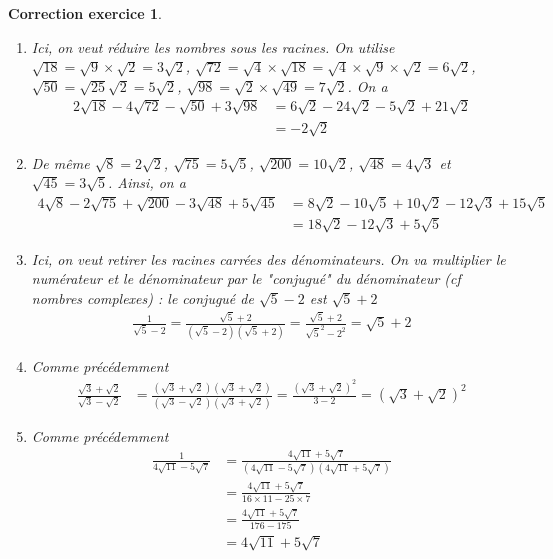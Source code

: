 \documentclass[12pt]{article}
\newtheorem{correction}{\bf Correction exercice}
\newenvironment{cor}{
\begin{correction}\smallskip\normalfont}{\end{correction}
}
\newif\ifcorrige\corrigetrue
\begin{document}
\ifcorrige
\color{magenta}
\begin{cor}
  $\qquad$
\begin{enumerate}
\item Ici, on veut r\'eduire les nombres sous les racines.
  On utilise $\sqrt{18} = \sqrt{9} \times \sqrt{2} = 3\sqrt{2}$,
  $\sqrt{72} = \sqrt{4} \times \sqrt{18} = \sqrt{4} \times \sqrt{9} \times \sqrt{2} = 6\sqrt{2}$,
  $\sqrt{50} = \sqrt{25} \sqrt{2} = 5 \sqrt{2}$,
  $\sqrt{98} = \sqrt{2} \times \sqrt{49} = 7 \sqrt{2}$.
  On a
  \begin{align*}
    2 \sqrt{18} - 4 \sqrt{72} - \sqrt{50} + 3\sqrt{98}
    &= 6 \sqrt{2} - 24 \sqrt{2} - 5 \sqrt{2} +  21\sqrt{2}
    \\
    &= -2 \sqrt{2}
  \end{align*}
\item De m\^eme
  $\sqrt{8} = 2 \sqrt{2}$, $\sqrt{75} = 5 \sqrt{5}$, $\sqrt{200} = 10 \sqrt{2}$,
  $\sqrt{48} = 4 \sqrt{3}$ et $\sqrt{45} = 3 \sqrt{5}$.
  Ainsi, on a
  \begin{align*}
    4\sqrt{8} -2\sqrt{75} + \sqrt{200}-3\sqrt{48}+5\sqrt{45}
    &= 8 \sqrt{2} - 10 \sqrt{5} + 10 \sqrt{2} - 12 \sqrt{3} +15 \sqrt{5}
    \\
    &= 18 \sqrt{2} - 12 \sqrt{3} + 5 \sqrt{5}
  \end{align*}
\item Ici, on veut retirer les racines carr\'ees des d\'enominateurs.
  On va multiplier le num\'erateur et le d\'enominateur par le "conjugu\'e" du d\'enominateur
  (cf nombres complexes) : le conjugu\'e de $\sqrt{5}-2$ est $\sqrt{5}+2$
  \begin{align*}
    \frac1{\sqrt{5}-2}
    = \frac{\sqrt{5}+2}{(\sqrt{5}-2)(\sqrt{5}+2)}= \frac{\sqrt{5}+2}{\sqrt{5}^2-2^2}
    = \sqrt{5}+2
  \end{align*}
\item Comme pr\'ec\'edemment
  \begin{align*}
    \frac{\sqrt{3}+\sqrt{2}}{\sqrt{3}-\sqrt{2}}
    &= \frac{(\sqrt{3}+\sqrt{2})(\sqrt{3}+\sqrt{2})}{(\sqrt{3}-\sqrt{2})(\sqrt{3}+\sqrt{2})}
      = \frac{(\sqrt{3}+\sqrt{2})^2}{3-2}
      = (\sqrt{3}+\sqrt{2})^2
  \end{align*}

\item
  Comme pr\'ec\'edemment
  \begin{align*}
    \frac1{4\sqrt{11} -5\sqrt{7}}
    &= \frac{4\sqrt{11}+5\sqrt{7}}{(4\sqrt{11} -5\sqrt{7})(4\sqrt{11} +5\sqrt{7})}
    \\
    &= \frac{4\sqrt{11}+5\sqrt{7}}{16 \times 11 - 25 \times 7}
    \\
    &= \frac{4\sqrt{11}+5\sqrt{7}}{176 - 175}
    \\
    &= 4\sqrt{11}+5\sqrt{7}
  \end{align*}


\end{enumerate}
\end{cor}
\end{document}
